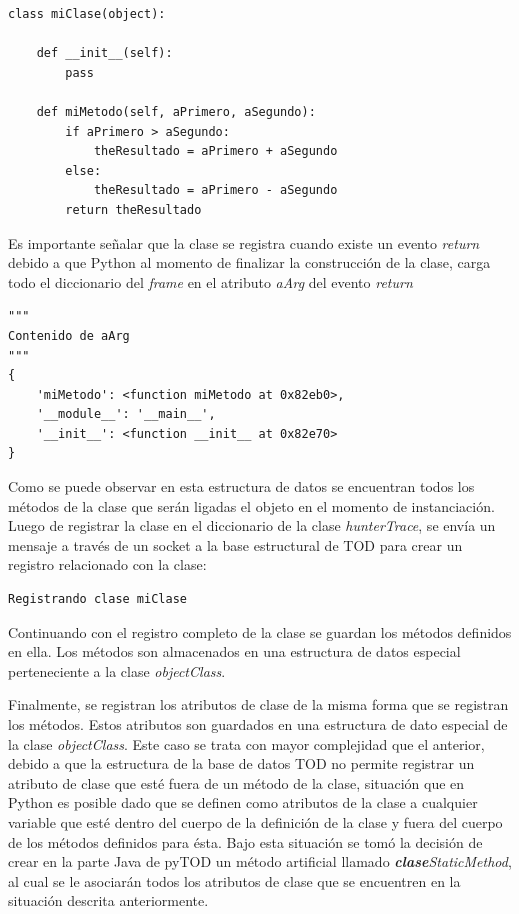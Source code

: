 \documentclass[12pt,legalpaper]{report}
\begin{document}
\begin{singlespace}
\begin{lstlisting}[style=Python]
class miClase(object):

    def __init__(self):
        pass
    
    def miMetodo(self, aPrimero, aSegundo):
        if aPrimero > aSegundo:
            theResultado = aPrimero + aSegundo
        else:
            theResultado = aPrimero - aSegundo
        return theResultado
\end{lstlisting}
\end{singlespace}

Es importante señalar que la clase se registra cuando existe un evento \textit{return} debido a que Python al momento de finalizar la construcción de la clase, carga todo el diccionario del \textit{frame} en el atributo \textit{aArg} del evento \textit{return} \cite{bytecode} 

\begin{singlespace}
\begin{lstlisting}[style=consola,numbers=none]
"""
Contenido de aArg
"""
{
	'miMetodo': <function miMetodo at 0x82eb0>, 
	'__module__': '__main__',
	'__init__': <function __init__ at 0x82e70>
}

\end{lstlisting}
\end{singlespace}

Como se puede observar en esta estructura de datos se encuentran todos los métodos de la clase que serán ligadas el objeto en el momento de instanciación.  Luego de registrar la clase en el diccionario de la clase \textit{hunterTrace}, se envía un mensaje a través de un socket a la base estructural de TOD para crear un registro relacionado con la clase:

\begin{singlespace}
\begin{lstlisting}[style=consola,numbers=none]
Registrando clase miClase
\end{lstlisting}
\end{singlespace}

Continuando con el registro completo de la clase se guardan los métodos definidos en ella.  Los métodos son almacenados en una estructura de datos especial perteneciente a la clase \textit{objectClass}.

Finalmente, se registran los atributos de clase de la misma forma que se registran los métodos.  Estos atributos son guardados en una estructura de dato especial de la clase \textit{objectClass}.  Este caso se trata con mayor complejidad que el anterior, debido a que la estructura de la base de datos TOD no permite registrar un atributo de clase que esté fuera de un método de la clase, situación que en Python es posible dado que se definen como atributos de la clase a cualquier variable que esté dentro del cuerpo de la definición de la clase y fuera del cuerpo de los métodos definidos para ésta.  Bajo esta situación se tomó la decisión de crear en la parte Java de pyTOD un método artificial llamado \textit{\textbf{clase}StaticMethod}, al cual se le asociarán todos los atributos de clase que se encuentren en la situación descrita anteriormente.
\end{document}
